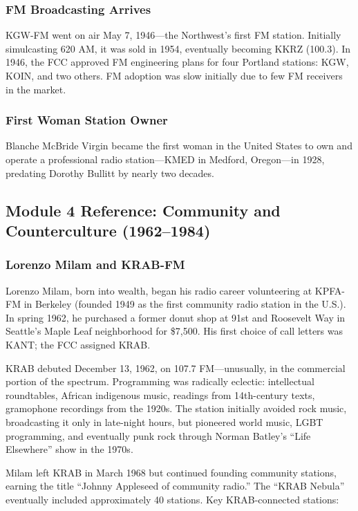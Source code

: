 \documentclass[11pt,letterpaper]{article}
\begin{document}
\subsubsection{FM Broadcasting Arrives}

KGW-FM went on air May 7, 1946---the Northwest's first FM station. Initially simulcasting 620 AM, it was sold in 1954, eventually becoming KKRZ (100.3). In 1946, the FCC approved FM engineering plans for four Portland stations: KGW, KOIN, and two others. FM adoption was slow initially due to few FM receivers in the market.

\subsubsection{First Woman Station Owner}

Blanche McBride Virgin became the first woman in the United States to own and operate a professional radio station---KMED in Medford, Oregon---in 1928, predating Dorothy Bullitt by nearly two decades.

\subsection{Module 4 Reference: Community and Counterculture (1962--1984)}

\subsubsection{Lorenzo Milam and KRAB-FM}

Lorenzo Milam, born into wealth, began his radio career volunteering at KPFA-FM in Berkeley (founded 1949 as the first community radio station in the U.S.). In spring 1962, he purchased a former donut shop at 91st and Roosevelt Way in Seattle's Maple Leaf neighborhood for \$7,500. His first choice of call letters was KANT; the FCC assigned KRAB.

KRAB debuted December 13, 1962, on 107.7 FM---unusually, in the commercial portion of the spectrum. Programming was radically eclectic: intellectual roundtables, African indigenous music, readings from 14th-century texts, gramophone recordings from the 1920s. The station initially avoided rock music, broadcasting it only in late-night hours, but pioneered world music, LGBT programming, and eventually punk rock through Norman Batley's ``Life Elsewhere'' show in the 1970s.

Milam left KRAB in March 1968 but continued founding community stations, earning the title ``Johnny Appleseed of community radio.'' The ``KRAB Nebula'' eventually included approximately 40 stations. Key KRAB-connected stations:
\end{document}
